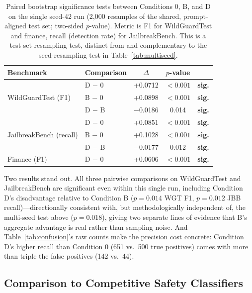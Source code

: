 \documentclass[superintelligence,article,submit,pdftex,moreauthors]{Definitions/mdpi}
\begin{document}
\begin{table}[H]
  \caption{Paired bootstrap significance tests between Conditions 0, B, and D on the single seed-42 run (2{,}000 resamples of the shared, prompt-aligned test set; two-sided $p$-value). Metric is F1 for WildGuardTest and finance, recall (detection rate) for JailbreakBench. This is a test-set-resampling test, distinct from and complementary to the seed-resampling test in Table~\ref{tab:multiseed}.\label{tab:sigtest}}
  \centering
  \small
  \begin{tabular}{llccc}
    \toprule
    Benchmark & Comparison & $\Delta$ & $p$-value & \\
    \midrule
    \multirow{3}{*}{WildGuardTest (F1)}
    & D $-$ 0 & +0.0712 & $<0.001$ & \textbf{sig.} \\
    & B $-$ 0 & +0.0898 & $<0.001$ & \textbf{sig.} \\
    & D $-$ B & $-$0.0186 & 0.014 & \textbf{sig.} \\
    \midrule
    \multirow{3}{*}{JailbreakBench (recall)}
    & D $-$ 0 & +0.0851 & $<0.001$ & \textbf{sig.} \\
    & B $-$ 0 & +0.1028 & $<0.001$ & \textbf{sig.} \\
    & D $-$ B & $-$0.0177 & 0.012 & \textbf{sig.} \\
    \midrule
    Finance (F1) & D $-$ 0 & +0.0606 & $<0.001$ & \textbf{sig.} \\
    \bottomrule
  \end{tabular}
\end{table}

Two results stand out. All three pairwise comparisons on WildGuardTest and JailbreakBench are significant even within this single run, including Condition D's disadvantage relative to Condition B ($p=0.014$ WGT F1, $p=0.012$ JBB recall)---directionally consistent with, but methodologically independent of, the multi-seed test above ($p=0.018$), giving two separate lines of evidence that B's aggregate advantage is real rather than sampling noise. And Table~\ref{tab:confusion}'s raw counts make the precision cost concrete: Condition D's higher recall than Condition 0 (651 vs.\ 500 true positives) comes with more than triple the false positives (142 vs.\ 44).

\subsection{Comparison to Competitive Safety Classifiers}
\label{sec:competitive}
\end{document}
